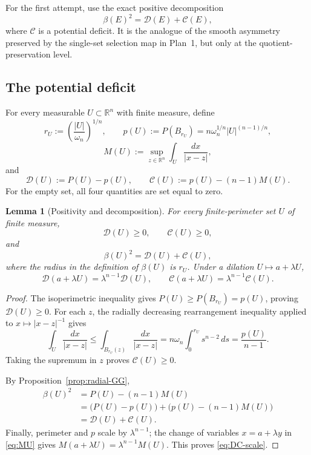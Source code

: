 \documentclass[11pt]{amsart}
\newtheorem{lemma}[theorem]{Lemma}
\theoremstyle{definition}
\newcommand{\R}{\mathbb R}
\newcommand{\Per}{P}
\newcommand{\Def}{\mathcal D}
\begin{document}
For the first attempt, use the exact positive decomposition
\[
   \beta(E)^2=\Def(E)+\mathcal C(E),
\tag{4.1}\label{eq:beta-decomposition-selection}
\]
where \(\mathcal C\) is a potential deficit.  It is the analogue of the
smooth asymmetry preserved by the single-set selection map in Plan~1, but
only at the quotient-preservation level.

\subsection{The potential deficit}

For every measurable \(U\subset\R^n\) with finite measure, define
\[
   r_U:=\left(\frac{|U|}{\omega_n}\right)^{1/n},
   \qquad
   p(U):=\Per(B_{r_U})
          =n\omega_n^{1/n}|U|^{(n-1)/n},
\tag{4.2}\label{eq:pU}
\]
\[
   M(U):=\sup_{z\in\R^n}\int_U\frac{dx}{|x-z|},
\tag{4.3}\label{eq:MU}
\]
and
\[
   \Def(U):=\Per(U)-p(U),\qquad
   \mathcal C(U):=p(U)-(n-1)M(U).
\tag{4.4}\label{eq:DC-general}
\]
For the empty set, all four quantities are set equal to zero.

\begin{lemma}[Positivity and decomposition]\label{lem:C-decomposition}
For every finite-perimeter set \(U\) of finite measure,
\[
   \Def(U)\ge0,\qquad \mathcal C(U)\ge0,
\tag{4.5}\label{eq:DC-positive}
\]
and
\[
   \beta(U)^2=\Def(U)+\mathcal C(U),
\tag{4.6}\label{eq:beta-DC}
\]
where the radius in the definition of \(\beta(U)\) is \(r_U\).
Under a dilation \(U\mapsto a+\lambda U\),
\[
   \Def(a+\lambda U)=\lambda^{n-1}\Def(U),\qquad
   \mathcal C(a+\lambda U)=\lambda^{n-1}\mathcal C(U).
\tag{4.7}\label{eq:DC-scale}
\]
\end{lemma}

\begin{proof}
The isoperimetric inequality gives
\(\Per(U)\ge\Per(B_{r_U})=p(U)\), proving \(\Def(U)\ge0\).
For each \(z\), the radially decreasing rearrangement inequality applied to
\(x\mapsto |x-z|^{-1}\) gives
\[
   \int_U\frac{dx}{|x-z|}
   \le\int_{B_{r_U}(z)}\frac{dx}{|x-z|}
   =n\omega_n\int_0^{r_U}s^{n-2}\,ds
   =\frac{p(U)}{n-1}.
\]
Taking the supremum in \(z\) proves \(\mathcal C(U)\ge0\).

By Proposition~\ref{prop:radial-GG},
\[
\begin{aligned}
   \beta(U)^2
   &=\Per(U)-(n-1)M(U) \\
   &=\bigl(\Per(U)-p(U)\bigr)
     +\bigl(p(U)-(n-1)M(U)\bigr) \\
   &=\Def(U)+\mathcal C(U).
\end{aligned}
\]
Finally, perimeter and \(p\) scale by \(\lambda^{n-1}\); the change of
variables \(x=a+\lambda y\) in \eqref{eq:MU} gives
\(M(a+\lambda U)=\lambda^{n-1}M(U)\).  This proves
\eqref{eq:DC-scale}.
\end{proof}
\end{document}
